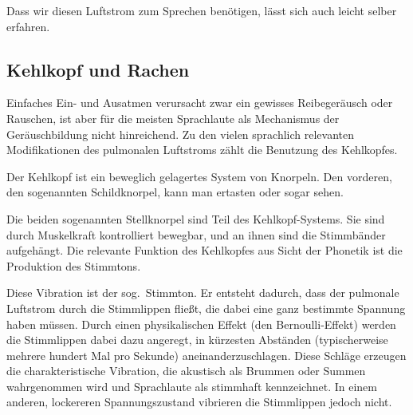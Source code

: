 Dass wir diesen Luftstrom zum Sprechen benötigen, lässt sich auch leicht selber erfahren.


\subsection{Kehlkopf und Rachen}

\label{sec:kehlkopf}

Einfaches Ein- und Ausatmen verursacht zwar ein gewisses Reibegeräusch oder Rauschen, ist aber für die meisten Sprachlaute als Mechanismus der Geräuschbildung nicht hinreichend.
Zu den vielen sprachlich relevanten Modifikationen des pulmonalen Luftstroms zählt die Benutzung des Kehlkopfes.

Der Kehlkopf ist ein beweglich gelagertes System von Knorpeln.
Den vorderen, den sogenannten Schildknorpel, kann man ertasten oder sogar sehen.


Die beiden sogenannten Stellknorpel sind Teil des Kehlkopf-Systems.
Sie sind durch Muskelkraft kontrolliert bewegbar, und an ihnen sind die Stimmbänder aufgehängt.
Die relevante Funktion des Kehlkopfes aus Sicht der Phonetik ist die Produktion des Stimmtons.


Diese Vibration ist der sog.\ Stimmton.
Er entsteht dadurch, dass der pulmonale Luftstrom durch die Stimmlippen fließt, die dabei eine ganz bestimmte Spannung haben müssen.
Durch einen physikalischen Effekt (den Bernoulli-Effekt) werden die Stimmlippen dabei dazu angeregt, in kürzesten Abständen (typischerweise mehrere hundert Mal pro Sekunde) aneinanderzuschlagen.
Diese Schläge erzeugen die charakteristische Vibration, die akustisch als Brummen oder Summen wahrgenommen wird und Sprachlaute als stimmhaft kennzeichnet.
In einem anderen, lockereren Spannungszustand vibrieren die Stimmlippen jedoch nicht.

